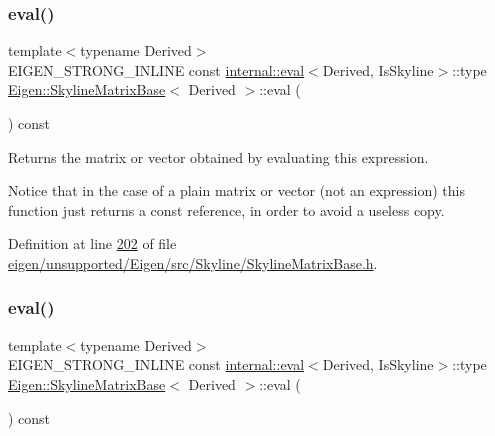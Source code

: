 \subsubsection{\texorpdfstring{eval()}{eval()}\hspace{0.1cm}{\footnotesize\ttfamily [1/2]}}
{\footnotesize\ttfamily template$<$typename Derived$>$ \\
E\+I\+G\+E\+N\+\_\+\+S\+T\+R\+O\+N\+G\+\_\+\+I\+N\+L\+I\+NE const \hyperlink{struct_eigen_1_1internal_1_1eval}{internal\+::eval}$<$Derived, Is\+Skyline$>$\+::type \hyperlink{class_eigen_1_1_skyline_matrix_base}{Eigen\+::\+Skyline\+Matrix\+Base}$<$ Derived $>$\+::eval (\begin{DoxyParamCaption}{ }\end{DoxyParamCaption}) const\hspace{0.3cm}{\ttfamily [inline]}}

\begin{DoxyReturn}{Returns}
the matrix or vector obtained by evaluating this expression.
\end{DoxyReturn}
Notice that in the case of a plain matrix or vector (not an expression) this function just returns a const reference, in order to avoid a useless copy. 

Definition at line \hyperlink{eigen_2unsupported_2_eigen_2src_2_skyline_2_skyline_matrix_base_8h_source_l00202}{202} of file \hyperlink{eigen_2unsupported_2_eigen_2src_2_skyline_2_skyline_matrix_base_8h_source}{eigen/unsupported/\+Eigen/src/\+Skyline/\+Skyline\+Matrix\+Base.\+h}.

\mbox{\label{class_eigen_1_1_skyline_matrix_base_a03d2346d1bc95c63405e03b6a39d2f7e}} 
\subsubsection{\texorpdfstring{eval()}{eval()}\hspace{0.1cm}{\footnotesize\ttfamily [2/2]}}
{\footnotesize\ttfamily template$<$typename Derived$>$ \\
E\+I\+G\+E\+N\+\_\+\+S\+T\+R\+O\+N\+G\+\_\+\+I\+N\+L\+I\+NE const \hyperlink{struct_eigen_1_1internal_1_1eval}{internal\+::eval}$<$Derived, Is\+Skyline$>$\+::type \hyperlink{class_eigen_1_1_skyline_matrix_base}{Eigen\+::\+Skyline\+Matrix\+Base}$<$ Derived $>$\+::eval (\begin{DoxyParamCaption}{ }\end{DoxyParamCaption}) const\hspace{0.3cm}{\ttfamily [inline]}}

